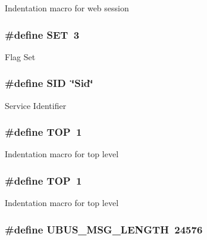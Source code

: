 Indentation macro for web session \hypertarget{group__LIBHELP_ga59da1d65e87a723efe808dbabb4fc205}{
\subsubsection[{S\-E\-T}]{\setlength{\rightskip}{0pt plus 5cm}\#define S\-E\-T~3}}\label{group__LIBHELP_ga59da1d65e87a723efe808dbabb4fc205}
Flag Set \hypertarget{group__LIBHELP_ga7b7a6526ee4fc05f1bdd0f05079754d9}{
\subsubsection[{S\-I\-D}]{\setlength{\rightskip}{0pt plus 5cm}\#define S\-I\-D~\char`\"{}Sid\char`\"{}}}\label{group__LIBHELP_ga7b7a6526ee4fc05f1bdd0f05079754d9}
Service Identifier \hypertarget{group__LIBHELP_gafc0eef637f1016e8786e45e106a4881e}{
\subsubsection[{T\-O\-P}]{\setlength{\rightskip}{0pt plus 5cm}\#define T\-O\-P~1}}\label{group__LIBHELP_gafc0eef637f1016e8786e45e106a4881e}
Indentation macro for top level \hypertarget{group__LIBHELP_gafc0eef637f1016e8786e45e106a4881e}{
\subsubsection[{T\-O\-P}]{\setlength{\rightskip}{0pt plus 5cm}\#define T\-O\-P~1}}\label{group__LIBHELP_gafc0eef637f1016e8786e45e106a4881e}
Indentation macro for top level \hypertarget{group__LIBHELP_gaa4779e6716ca8a3d99dd1f16579dccc3}{
\subsubsection[{U\-B\-U\-S\-\_\-\-M\-S\-G\-\_\-\-L\-E\-N\-G\-T\-H}]{\setlength{\rightskip}{0pt plus 5cm}\#define U\-B\-U\-S\-\_\-\-M\-S\-G\-\_\-\-L\-E\-N\-G\-T\-H~24576}}\label{group__LIBHELP_gaa4779e6716ca8a3d99dd1f16579dccc3}
